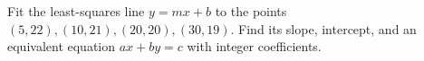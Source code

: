 Fit the least-squares line $y=mx+b$ to the points $(5,22),(10,21),(20,20),(30,19)$. Find its slope, intercept, and an equivalent equation $ax+by=c$ with integer coefficients.
